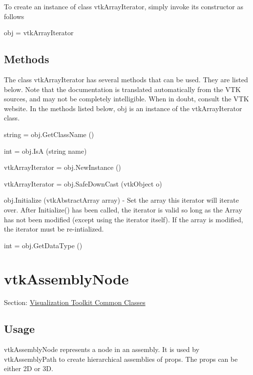 To create an instance of class vtk\-Array\-Iterator, simply invoke its constructor as follows \begin{DoxyVerb}  obj = vtkArrayIterator
\end{DoxyVerb}
 \hypertarget{vtkwidgets_vtkxyplotwidget_Methods}{}\subsection{Methods}\label{vtkwidgets_vtkxyplotwidget_Methods}
The class vtk\-Array\-Iterator has several methods that can be used. They are listed below. Note that the documentation is translated automatically from the V\-T\-K sources, and may not be completely intelligible. When in doubt, consult the V\-T\-K website. In the methods listed below, {\ttfamily obj} is an instance of the vtk\-Array\-Iterator class. 
\begin{DoxyItemize}
\item {\ttfamily string = obj.\-Get\-Class\-Name ()}  
\item {\ttfamily int = obj.\-Is\-A (string name)}  
\item {\ttfamily vtk\-Array\-Iterator = obj.\-New\-Instance ()}  
\item {\ttfamily vtk\-Array\-Iterator = obj.\-Safe\-Down\-Cast (vtk\-Object o)}  
\item {\ttfamily obj.\-Initialize (vtk\-Abstract\-Array array)} -\/ Set the array this iterator will iterate over. After Initialize() has been called, the iterator is valid so long as the Array has not been modified (except using the iterator itself). If the array is modified, the iterator must be re-\/intialized.  
\item {\ttfamily int = obj.\-Get\-Data\-Type ()}  
\end{DoxyItemize}\hypertarget{vtkcommon_vtkassemblynode}{}\section{vtk\-Assembly\-Node}\label{vtkcommon_vtkassemblynode}
Section\-: \hyperlink{sec_vtkcommon}{Visualization Toolkit Common Classes} \hypertarget{vtkwidgets_vtkxyplotwidget_Usage}{}\subsection{Usage}\label{vtkwidgets_vtkxyplotwidget_Usage}
vtk\-Assembly\-Node represents a node in an assembly. It is used by vtk\-Assembly\-Path to create hierarchical assemblies of props. The props can be either 2\-D or 3\-D.

